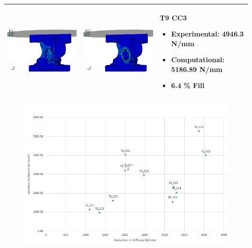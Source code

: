 \documentclass[11pt,a4paper]{article}
\begin{document}
\begin{landscape}
\begin{longtable}{|m{11cm}|m{11cm}|m{4cm}|}
\includegraphics[width=10cm]{images/T9_CC3_postVP_Interface_ABAQUS_All_Side_Stress.png}   & \includegraphics[width=10cm]{images/T9_CC3_postVP_Interface_ABAQUS_All_Side_Strain.png}   & T9 CC3  \begin{itemize} \item Experimental: 	4946.3	N/mm \item Computational:	5186.89 N/mm \item 6.4 \% Fill \end{itemize} \\ \hline 
\end{longtable}


\end{landscape}

\begin{figure}[ht!]
\centering
\includegraphics[width=15cm]{images/plot_surf_vs_stiff.png}
\end{figure}
\end{document}
